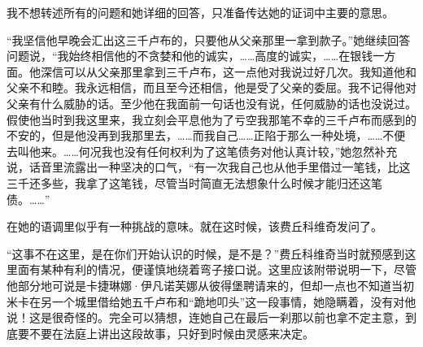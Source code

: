 \par 我不想转述所有的问题和她详细的回答，只准备传达她的证词中主要的意思。
\par “我坚信他早晚会汇出这三千卢布的，只要他从父亲那里一拿到款子。”她继续回答问题说，“我始终相信他的不贪婪和他的诚实，……高度的诚实，……在银钱一方面。他深信可以从父亲那里拿到三千卢布，这一点他对我说过好几次。我知道他和父亲不和睦。我永远相信，而且至今还相信，他是受了父亲的委屈。我不记得他对父亲有什么威胁的话。至少他在我面前一句话也没有说，任何威胁的话也没说过。假使他当时到我这里来，我立刻会平息他为了亏空我那笔不幸的三千卢布而感到的不安的，但是他没再到我那里去，……而我自己……正陷于那么一种处境，……不便去叫他来。……何况我也没有任何权利为了这笔债务对他认真计较，”她忽然补充说，话音里流露出一种坚决的口气，“有一次我自己也从他手里借过一笔钱，比这三千还多些，我拿了这笔钱，尽管当时简直无法想象什么时候才能归还这笔债。……”
\par 在她的语调里似乎有一种挑战的意味。就在这时候，该费丘科维奇发问了。
\par “这事不在这里，是在你们开始认识的时候，是不是？”费丘科维奇当时就预感到这里面有某种有利的情况，便谨慎地绕着弯子接口说。这里应该附带说明一下，尽管他部分地可说是卡捷琳娜·伊凡诺芙娜从彼得堡聘请来的，但却一点也不知道当初米卡在另一个城里借给她五千卢布和“跪地叩头”这一段事情，她隐瞒着，没有对他说！这是很奇怪的。完全可以猜想，连她自己在最后一刹那以前也拿不定主意，到底要不要在法庭上讲出这段故事，只好到时候由灵感来决定。
